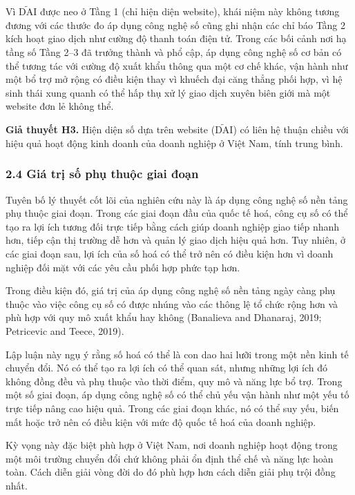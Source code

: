 \documentclass[12pt,a4paper]{article}
\begin{document}
Vì \(\tilde{\mathrm{DAI}}\) được neo ở Tầng 1 (chỉ hiện diện website),
khái niệm này không tương đương với các thước đo áp dụng công nghệ số
cũng ghi nhận các chỉ báo Tầng 2 kích hoạt giao dịch như cường độ thanh
toán điện tử. Trong các bối cảnh nơi hạ tầng số Tầng 2--3 đã trưởng
thành và phổ cập, áp dụng công nghệ số cơ bản có thể tương tác với cường
độ xuất khẩu thông qua một cơ chế khác, vận hành như một bổ trợ mở rộng
có điều kiện thay vì khuếch đại căng thẳng phối hợp, vì hệ sinh thái
xung quanh có thể hấp thụ xử lý giao dịch xuyên biên giới mà một website
đơn lẻ không thể.

\textbf{Giả thuyết H3.} Hiện diện số dựa trên website
(\(\tilde{\mathrm{DAI}}\)) có liên hệ thuận chiều với hiệu quả hoạt động
kinh doanh của doanh nghiệp ở Việt Nam, tính trung bình.

\hypertarget{24-giuxe1-trux1ecb-sux1ed1-phux1ee5-thuux1ed9c-giai-ux111oux1ea1n}{%
\subsubsection{2.4 Giá trị số phụ thuộc giai
đoạn}\label{24-giuxe1-trux1ecb-sux1ed1-phux1ee5-thuux1ed9c-giai-ux111oux1ea1n}}

Tuyên bố lý thuyết cốt lõi của nghiên cứu này là áp dụng công nghệ số
nền tảng phụ thuộc giai đoạn. Trong các giai đoạn đầu của quốc tế hoá,
công cụ số có thể tạo ra lợi ích tương đối trực tiếp bằng cách giúp
doanh nghiệp giao tiếp nhanh hơn, tiếp cận thị trường dễ hơn và quản lý
giao dịch hiệu quả hơn. Tuy nhiên, ở các giai đoạn sau, lợi ích của số
hoá có thể trở nên có điều kiện hơn vì doanh nghiệp đối mặt với các yêu
cầu phối hợp phức tạp hơn.

Trong điều kiện đó, giá trị của áp dụng công nghệ số nền tảng ngày càng
phụ thuộc vào việc công cụ số có được nhúng vào các thông lệ tổ chức
rộng hơn và phù hợp với quy mô xuất khẩu hay không (Banalieva and
Dhanaraj, 2019; Petricevic and Teece, 2019).

Lập luận này ngụ ý rằng số hoá có thể là con dao hai lưỡi trong một nền
kinh tế chuyển đổi. Nó có thể tạo ra lợi ích có thể quan sát, nhưng
những lợi ích đó không đồng đều và phụ thuộc vào thời điểm, quy mô và
năng lực bổ trợ. Trong một số giai đoạn, áp dụng công nghệ số có thể chủ
yếu vận hành như một yếu tố trực tiếp nâng cao hiệu quả. Trong các giai
đoạn khác, nó có thể suy yếu, biến mất hoặc trở nên có điều kiện với mức
độ quốc tế hoá của doanh nghiệp.

Kỳ vọng này đặc biệt phù hợp ở Việt Nam, nơi doanh nghiệp hoạt động
trong một môi trường chuyển đổi chứ không phải ổn định thể chế và năng
lực hoàn toàn. Cách diễn giải vòng đời do đó phù hợp hơn cách diễn giải
phụ trội đồng nhất.
\end{document}
